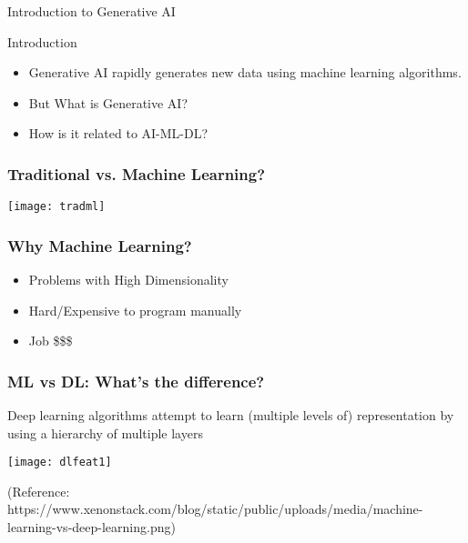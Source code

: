 \begin{frame}[fragile]\frametitle{}
\begin{center}
{\Large Introduction to Generative AI}
\end{center}
\end{frame}

\begin{frame}[fragile]{Introduction}
\begin{itemize}
\item Generative AI rapidly generates new data using machine learning algorithms.
\item But What is Generative AI?
\item How is it related to AI-ML-DL?
\end{itemize}
\end{frame}

\begin{frame}[fragile]\frametitle{Traditional vs. Machine Learning?}
\begin{center}
\texttt{[image: tradml]}
\end{center}
\end{frame}

\begin{frame}[fragile]\frametitle{Why Machine Learning?}
\begin{itemize}
\item Problems with High Dimensionality
\item Hard/Expensive to program manually
\item Job \$\$\$
\end{itemize}
\end{frame}


\begin{frame}[fragile] \frametitle{ML vs DL: What's the difference?}
Deep learning algorithms attempt to learn (multiple levels of) representation by using a hierarchy of multiple layers
\begin{center}
\texttt{[image: dlfeat1]}
\end{center}
\tiny{(Reference: https://www.xenonstack.com/blog/static/public/uploads/media/machine-learning-vs-deep-learning.png)}

\end{frame}

